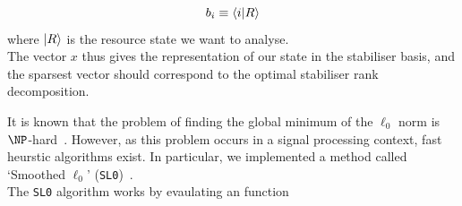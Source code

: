 \documentclass{standalone}
\begin{document}
\begin{equation}
    b_{i}\equiv \braket{i}{R}
\end{equation}
where $\ket{R}$ is the resource state we want to analyse.\\
The vector $x$ thus gives the representation of our state in the stabiliser basis, and the sparsest vector should correspond to the optimal stabiliser rank decomposition. 
\par
It is known that the problem of finding the global minimum of the $\ell_{0}$ norm is $\NP$-hard~\cite{ge2011note}. However, as this problem occurs in a signal processing context, fast heurstic algorithms exist. In particular, we implemented a method called `Smoothed $\ell_{0}$' (\texttt{SL0})~\cite{Mohimani2009}. \\
The \texttt{SL0} algorithm works by evaulating an function

\ifstandalone

\fi
\end{document}

